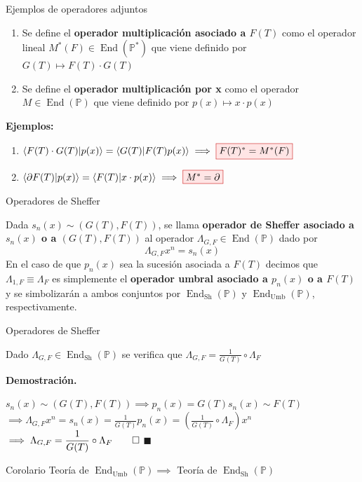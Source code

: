 \documentclass{beamer}
\newenvironment{definicion}[1][]{
  \begin{tcolorbox}[colback=red!10, colframe=red!80!black, title=Definición\ #1, fonttitle=\bfseries]
}{
  \end{tcolorbox}
}
\newenvironment{proposicion}[1][]{
  \begin{tcolorbox}[colback=darkred!10, colframe=darkred!70, title=Proposición\ #1, fonttitle=\bfseries]
}{
  \end{tcolorbox}
}
\newenvironment{demo}{%
  \par\medskip\noindent\textbf{Demostración.}\hspace{0.5em}%
}{%
  \hfill$\blacksquare$\par\medskip%
}
\newcommand{\rboxed}[1]{%
  \fcolorbox{red!80!black}{red!10}{$#1$}%
}
\newcommand{\poly}{\mathbb{P}} %
\DeclareMathOperator*{\End}{End} %
\begin{document}
\begin{frame}{Ejemplos de operadores adjuntos}
\begin{definicion}
  \begin{enumerate}
    \item Se define el \textbf{operador multiplicación asociado a $F(T)$} como el operador lineal $M^*(F) \in \End(\poly^*)$ que viene definido por $G(T) \mapsto F(T) \cdot G(T)$
    \item Se define el \textbf{operador multiplicación por x} como el operador $M \in \End(\poly)$ que viene definido por $p(x) \mapsto x \cdot p(x)$
  \end{enumerate}
  
\end{definicion}
  \textbf{Ejemplos:}
  \begin{enumerate}
      \item $\langle F(T) \cdot G(T) | p(x) \rangle = \langle G(T) | F(T)p(x) \rangle \implies \rboxed{F(T)^* = M^*(F)}$
      \item $\langle \partial F(T) | p(x) \rangle = \langle F(T) | x \cdot p(x)\rangle \implies \rboxed{M^* = \partial}$
    \end{enumerate}
\end{frame}

\begin{frame}{Operadores de Sheffer}
  \begin{definicion}
    Dada $s_n(x) \sim (G(T), F(T))$, se llama \textbf{operador de Sheffer asociado a $s_n(x)$ o a $(G(T), F(T))$} al operador $\Lambda_{G,F} \in \End(\poly)$ dado por
    \begin{equation*}
        \Lambda_{G,F} x^n = s_n(x)
    \end{equation*}
    En el caso de que $p_n(x)$ sea la sucesión asociada a $F(T)$ decimos que $\Lambda_{1, F} \equiv \Lambda_{F}$ es simplemente el \textbf{operador umbral asociado a $p_n(x) $ o a $F(T)$} y se simbolizarán a ambos conjuntos por $\End_{\mathrm{Sh}}(\poly)$ y $\End_{\mathrm{Umb}}(\poly)$, respectivamente.
  \end{definicion}
\end{frame}

\begin{frame}{Operadores de Sheffer}
  \begin{proposicion}
     Dado $\Lambda_{G,F} \in \End_{\mathrm{Sh}}(\poly)$ se verifica que $\Lambda_{G,F} = \frac{1}{G(T)} \circ \Lambda_{F}$
  \end{proposicion}

  \begin{demo}
    $\displaystyle s_n(x) \sim (G(T), F(T)) \implies p_n(x) = G(T)s_n(x) \sim F(T)$
    \bigbreak
    $\displaystyle \implies \Lambda_{G,F}x^n = s_n(x) = \frac{1}{G(T)} p_n(x) = \left(\frac{1}{G(T)} \circ \Lambda_{F}\right) x^n$
    \bigbreak
    $\displaystyle \implies \Lambda_{G,F} = \frac{1}{G(T)} \circ \Lambda_{F} \qedhere$
  \end{demo}

  \begin{block}{Corolario}
      Teoría de $\End_{\mathrm{Umb}}(\poly) \implies$ Teoría de $\End_{\mathrm{Sh}}(\poly)$
  \end{block}
\end{frame}
\end{document}
